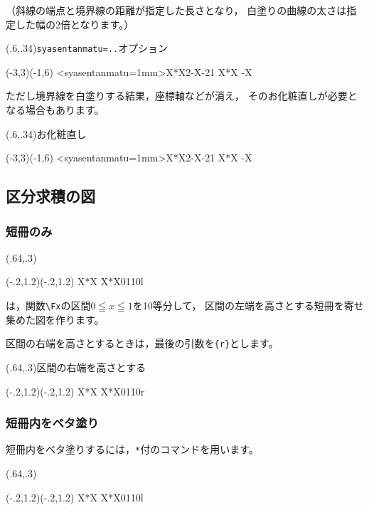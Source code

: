 （斜線の端点と境界線の距離が指定した長さとなり，
白塗りの曲線の太さは指定した幅の2倍となります。）

\begin{showEx}(.6,.34){\texttt{syasentanmatu=..}オプション}
\begin{zahyou}[ul=6mm](-3,3)(-1,6)
  \def\Fx{X*X}
  \def\Gx{2-X}
  \YNurii*<syasentanmatu=1mm>\Fx\Gx{-2}{1}
  \YGurafu*\Fx
  \YGurafu*\Gx
\end{zahyou}
\end{showEx}

ただし境界線を白塗りする結果，座標軸などが消え，
そのお化粧直しが必要となる場合もあります。

\begin{showEx}(.6,.34){お化粧直し}
\begin{zahyou}[ul=6mm](-3,3)(-1,6)
  \def\Fx{X*X}
  \def\Gx{2-X}
  \YNurii*<syasentanmatu=1mm>\Fx\Gx{-2}{1}
  \YGurafu*\Fx
  \YGurafu*\Gx
  \drawXaxis\drawYaxis%
\end{zahyou}
\end{showEx}

\subsection{区分求積の図}
\subsubsection{短冊のみ}
\begin{showEx}(.64,.3){}
\begin{zahyou}[ul=20mm](-.2,1.2)(-.2,1.2)
  \def\Fx{X*X}
  \YGurafu*\Fx
  \kubunkyuusekizu\Fx{0}{1}{10}{l}
\end{zahyou}
\end{showEx}
は，関数\verb+\Fx+の区間$0\leqq x\leqq 1$を10等分して，
区間の左端を高さとする短冊を寄せ集めた図を作ります。

区間の右端を高さとするときは，最後の引数を\verb+{r}+とします。

\begin{showEx}(.64,.3){区間の右端を高さとする}
\begin{zahyou}[ul=20mm](-.2,1.2)(-.2,1.2)
  \def\Fx{X*X}
  \YGurafu*\Fx
  \kubunkyuusekizu\Fx{0}{1}{10}{r}
\end{zahyou}
\end{showEx}

\subsubsection{短冊内をベタ塗り}
短冊内をベタ塗りするには，\verb+*+付のコマンドを用います。
\begin{showEx}(.64,.3){}
\begin{zahyou}[ul=20mm](-.2,1.2)(-.2,1.2)
  \def\Fx{X*X}
  \YGurafu*\Fx
  \kubunkyuusekizu*\Fx{0}{1}{10}{l}
\end{zahyou}
\end{showEx}

